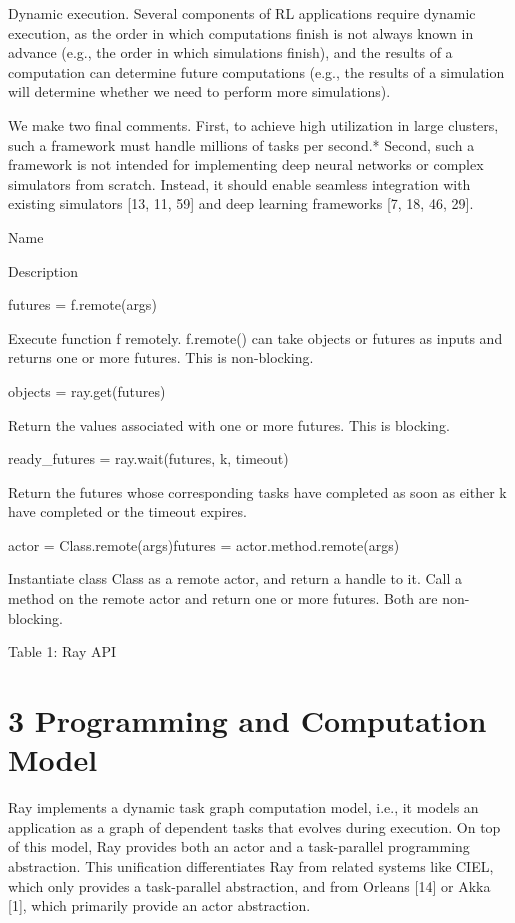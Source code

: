 \documentclass[
]{article}
\begin{document}
Dynamic execution. Several components of RL applications require dynamic
execution, as the order in which computations finish is not always known
in advance (e.g., the order in which simulations finish), and the
results of a computation can determine future computations (e.g., the
results of a simulation will determine whether we need to perform more
simulations).

We make two final comments. First, to achieve high utilization in large
clusters, such a framework must handle millions of tasks per second.*
Second, such a framework is not intended for implementing deep neural
networks or complex simulators from scratch. Instead, it should enable
seamless integration with existing simulators {[}13, 11, 59{]} and deep
learning frameworks {[}7, 18, 46, 29{]}.

Name

Description

futures = f.remote(args)

Execute function f remotely. f.remote() can take objects or futures as
inputs and returns one or more futures. This is non-blocking.

objects = ray.get(futures)

Return the values associated with one or more futures. This is blocking.

ready\_futures = ray.wait(futures, k, timeout)

Return the futures whose corresponding tasks have completed as soon as
either k have completed or the timeout expires.

actor = Class.remote(args)futures = actor.method.remote(args)

Instantiate class Class as a remote actor, and return a handle to it.
Call a method on the remote actor and return one or more futures. Both
are non-blocking.

Table 1: Ray API

\section{3 Programming and Computation
Model}\label{programming-and-computation-model}

Ray implements a dynamic task graph computation model, i.e., it models
an application as a graph of dependent tasks that evolves during
execution. On top of this model, Ray provides both an actor and a
task-parallel programming abstraction. This unification differentiates
Ray from related systems like CIEL, which only provides a task-parallel
abstraction, and from Orleans {[}14{]} or Akka {[}1{]}, which primarily
provide an actor abstraction.
\end{document}
